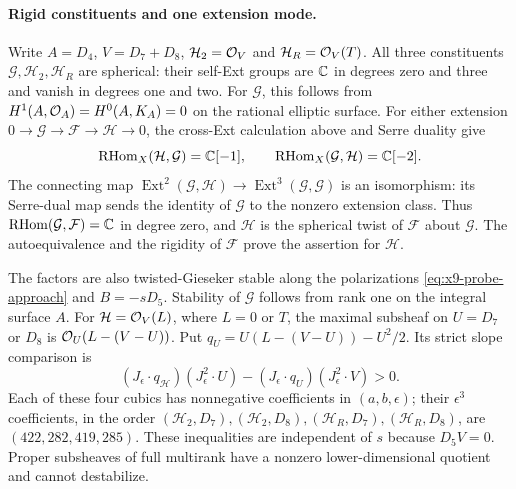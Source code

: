 \paragraph{Rigid constituents and one extension mode.}
Write $A=D_4$, $V=D_7+D_8$, $\mathcal H_2=\mathcal O_V$ and
$\mathcal H_R=\mathcal O_V(T)$. All three constituents
$\mathcal G,\mathcal H_2,\mathcal H_R$ are spherical: their
self-Ext groups are $\mathbb C$ in degrees zero and three and vanish in
degrees one and two. For $\mathcal G$, this follows from
$H^1(A,\mathcal O_A)=H^0(A,K_A)=0$ on the rational elliptic surface.
For either extension $0\to\mathcal G\to\mathcal F\to\mathcal H\to0$,
the cross-Ext calculation above and Serre duality give
\begin{equation}
 \operatorname{RHom}_X(\mathcal H,\mathcal G)=\mathbb C[-1],
 \qquad
 \operatorname{RHom}_X(\mathcal G,\mathcal H)=\mathbb C[-2].
 \label{eq:x9-probe-cross-ext}
\end{equation}
The connecting map
$\operatorname{Ext}^2(\mathcal G,\mathcal H)\to
\operatorname{Ext}^3(\mathcal G,\mathcal G)$ is an isomorphism:
its Serre-dual map sends the identity of $\mathcal G$ to the
nonzero extension class. Thus
$\operatorname{RHom}(\mathcal G,\mathcal F)=\mathbb C$ in degree zero,
and $\mathcal H$ is the spherical twist of $\mathcal F$ about
$\mathcal G$. The autoequivalence
\cite[Theorem~1.2]{Seidel:2001Twists} and the rigidity of
$\mathcal F$ prove the assertion for $\mathcal H$.

The factors are also twisted-Gieseker stable along the polarizations
\eqref{eq:x9-probe-approach} and $B=-sD_5$. Stability of
$\mathcal G$ follows from rank one on the integral surface $A$.
For $\mathcal H=\mathcal O_V(L)$, where $L=0$ or $T$, the maximal
subsheaf on $U=D_7$ or $D_8$ is $\mathcal O_U(L-(V-U))$. Put
$q_U=U(L-(V-U))-U^2/2$. Its strict slope comparison is
\begin{equation}
 (J_\epsilon\cdot q_{\mathcal H})(J_\epsilon^2\cdot U)
 -(J_\epsilon\cdot q_U)(J_\epsilon^2\cdot V)>0.
 \label{eq:x9-probe-factor-stability}
\end{equation}
Each of these four cubics has nonnegative coefficients in
$(a,b,\epsilon)$; their $\epsilon^3$ coefficients, in the order
$(\mathcal H_2,D_7),(\mathcal H_2,D_8),
(\mathcal H_R,D_7),(\mathcal H_R,D_8)$, are
$(422,282,419,285)$. These inequalities are independent of $s$
because $D_5V=0$. Proper subsheaves of full multirank have a
nonzero lower-dimensional quotient and cannot destabilize.

